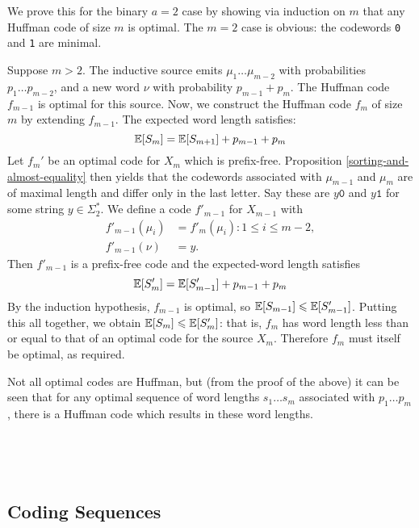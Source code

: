 \documentclass{article}
\begin{document}
\begin{prf}
	We prove this for the binary $a=2$ case
	by showing via induction on $m$ that any Huffman code of size $m$ is optimal.
	The $m=2$ case is obvious:
	the codewords \texttt{0} and \texttt{1} are minimal.
	
	Suppose $m > 2$.
	The inductive source emits $\mu_1 \dots \mu_{m-2}$
	with probabilities $p_1 \dots p_{m-2}$,
	and a new word $\nu$ with probability $p_{m-1} + p_m$.
	The Huffman code $f_{m-1}$ is optimal for this source.
	Now, we construct the Huffman code $f_m$ of size $m$
	by extending $f_{m-1}$.
	The expected word length satisfies:
	\[
	\mathbb{E}[S_m] = \mathbb{E}[S_{m+1}] + p_{m-1} + p_m
	\]
	Let $f_m'$ be an optimal code for $X_m$ which is prefix-free.
	Proposition \ref{sorting-and-almost-equality} then yields that
	the codewords associated with $\mu_{m-1}$ and $\mu_m$ are of maximal length
	and differ only in the last letter. 
	Say these are $y\texttt{0}$ and $y\texttt{1}$
	for some string $y \in \Sigma_2^*$.
	We define a code $f'_{m-1}$ for $X_{m-1}$ with
	\begin{align*}
    	f'_{m-1}(\mu_i) &= f'_{m}(\mu_i) : 1 \leq i \leq m-2, \\
    	f'_{m-1}(\nu) &= y.
	\end{align*}
	Then $f'_{m-1}$ is a prefix-free code
	and the expected-word length satisfies
	\[
	\mathbb{E}[S_{m}'] = \mathbb{E}[S'_{m-1}] + p_{m-1} + p_m
	\]
	By the induction hypothesis, $f_{m-1}$ is optimal,
	so $\mathbb{E}[S_{m-1}] \leqslant \mathbb{E}[S'_{m-1}]$.
	Putting this all together, we obtain $\mathbb{E}[S_m] \leqslant \mathbb{E}[S'_m]$:
	that is, $f_m$ has word length less than or equal to
	that of an optimal code for the source $X_m$.
	Therefore $f_m$ must itself be optimal, as required.
\end{prf}

\begin{note}
	Not all optimal codes are Huffman,
	but (from the proof of the above) it can be seen that
	for any optimal sequence of word lengths $s_1 \dots s_m$
	associated with $p_1 \dots p_m$,
	there is a Huffman code which results in these word lengths.
\end{note}

\

\


\subsection{Coding Sequences}
\end{document}
